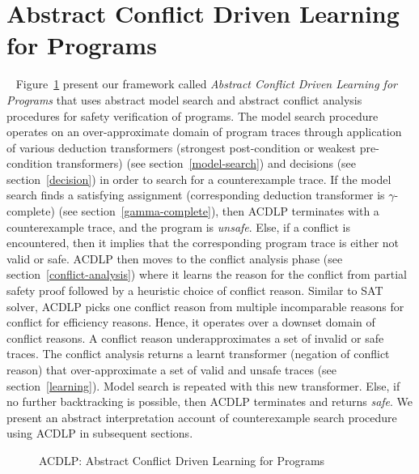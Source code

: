 \section{Abstract Conflict Driven Learning for Programs}~\label{acdlp}
%
Figure~\ref{acdlp-top} present our framework called \emph{Abstract Conflict 
Driven Learning for Programs} that uses abstract model search and abstract 
conflict analysis procedures for safety verification of programs.  The model
search procedure operates on an over-approximate domain of program
traces through application of various deduction transformers (strongest
post-condition or weakest pre-condition transformers) (see
section~\ref{model-search}) 
and decisions (see section~\ref{decision}) in order to search for a counterexample trace.  
If the model search finds a satisfying assignment
(corresponding deduction transformer is $\gamma$-complete) 
(see section~\ref{gamma-complete}), then ACDLP 
terminates with a counterexample trace, and the program is \emph{unsafe}.  
Else, if a conflict is encountered, then it implies that the corresponding 
program trace is either not valid or safe.  ACDLP then moves to the conflict 
analysis phase (see section~\ref{conflict-analysis}) where it learns the 
reason for the conflict from partial safety proof followed by a heuristic 
choice of conflict reason.  Similar to SAT solver, ACDLP picks one conflict 
reason from multiple
incomparable reasons for conflict for efficiency reasons. Hence, it operates over 
a downset domain of conflict reasons.  A conflict reason
underapproximates a set of invalid or safe traces. The conflict analysis returns a 
learnt transformer (negation of conflict reason) that over-approximate a set of 
valid and unsafe traces (see section~\ref{learning}). Model search is repeated with 
this new transformer.  Else, if no further backtracking is possible, then ACDLP 
terminates and returns \emph{safe}.  We present an abstract interpretation
account of counterexample search procedure using ACDLP in subsequent sections.
%
%
\begin{figure}
\centering
{}
\caption{ACDLP: Abstract Conflict Driven Learning for Programs \label{acdlp-top}}
\end{figure}
%
